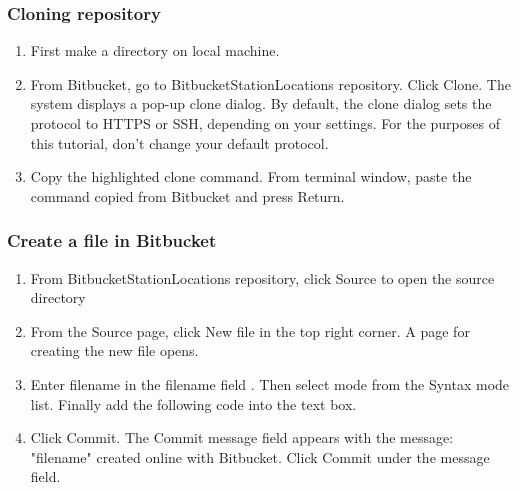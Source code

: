 \documentclass{beamer}
\begin{document}
\begin{frame}
\frametitle{Cloning repository}
 	\begin{enumerate}
        \item First make a directory on local machine.
        \item From Bitbucket, go to BitbucketStationLocations repository.
        Click Clone. The system displays a pop-up clone dialog. By default, the clone dialog sets the protocol to HTTPS or SSH, depending on your settings. For the purposes of this tutorial, don't change your default protocol.
        \item Copy the highlighted clone command. From terminal window, paste the command copied from Bitbucket and press Return.
    \end{enumerate}
\end{frame}

\begin{frame}
\frametitle{Create a file in Bitbucket}
 	\begin{enumerate}
 		\item From BitbucketStationLocations repository, click Source to open the source directory
        \item From the Source page, click New file in the top right corner.
    A page for creating the new file opens. 
        \item Enter filename in the  filename  field . Then select mode from the Syntax mode list. Finally add the following  code into the text box.
        \item Click Commit. The Commit message field appears with the message: "filename" created online with Bitbucket. Click Commit under the message field.
    \end{enumerate}
\end{frame}
\end{document}

